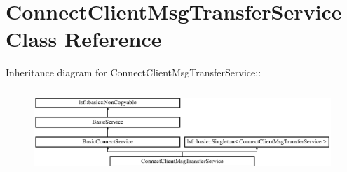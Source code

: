 \hypertarget{classConnectClientMsgTransferService}{
\section{ConnectClientMsgTransferService Class Reference}
\label{classConnectClientMsgTransferService}
}
Inheritance diagram for ConnectClientMsgTransferService::\begin{figure}[H]
\begin{center}
\leavevmode
\includegraphics[height=3.23699cm]{classConnectClientMsgTransferService}
\end{center}
\end{figure}
